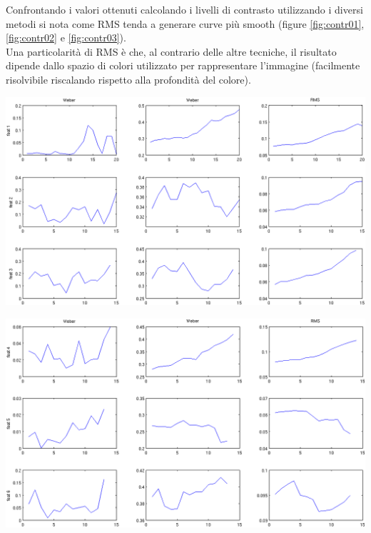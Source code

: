 \documentclass[12pt]{report}
\begin{document}
\noindent Confrontando i valori ottenuti calcolando i livelli di contrasto utilizzando i diversi metodi si nota come RMS tenda a generare curve pi\`u smooth (figure \ref{fig:contr01}, \ref{fig:contr02} e \ref{fig:contr03}).\\

\noindent Una particolarit\`a di RMS \`e che, al contrario delle altre tecniche, il risultato dipende dallo spazio di colori utilizzato per rappresentare l'immagine (facilmente risolvibile riscalando rispetto alla profondit\`a del colore).

\begin{center}
	\includegraphics[scale=0.7, angle=90.0]{images/compContr1.png}
	\label{fig:contr01}
\end{center}
\begin{center}
	\includegraphics[scale=0.7, angle=90.0]{images/compContr2.png}
	\label{fig:contr02}
\end{center}
\end{document}
